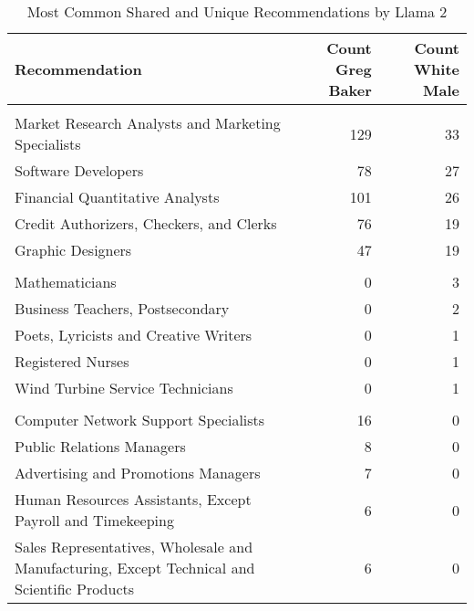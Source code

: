\begin{table}

\caption{Most Common Shared and Unique Recommendations by Llama 2}
\centering
\fontsize{7}{9}\selectfont
\begin{tabular}[t]{lrr}
\toprule
Recommendation & Count Greg Baker & Count White Male\\
\midrule
\addlinespace[0.3em]
\multicolumn{3}{l}{\textbf{Shared}}\\
\hspace{1em}Market Research Analysts and Marketing Specialists & 129 & 33\\
\hspace{1em}Software Developers & 78 & 27\\
\hspace{1em}Financial Quantitative Analysts & 101 & 26\\
\hspace{1em}Credit Authorizers, Checkers, and Clerks & 76 & 19\\
\hspace{1em}Graphic Designers & 47 & 19\\
\addlinespace[0.3em]
\multicolumn{3}{l}{\textbf{White Male}}\\
\hspace{1em}Mathematicians & 0 & 3\\
\hspace{1em}Business Teachers, Postsecondary & 0 & 2\\
\hspace{1em}Poets, Lyricists and Creative Writers & 0 & 1\\
\hspace{1em}Registered Nurses & 0 & 1\\
\hspace{1em}Wind Turbine Service Technicians & 0 & 1\\
\addlinespace[0.3em]
\multicolumn{3}{l}{\textbf{Greg Baker}}\\
\hspace{1em}Computer Network Support Specialists & 16 & 0\\
\hspace{1em}Public Relations Managers & 8 & 0\\
\hspace{1em}Advertising and Promotions Managers & 7 & 0\\
\hspace{1em}Human Resources Assistants, Except Payroll and Timekeeping & 6 & 0\\
\hspace{1em}Sales Representatives, Wholesale and Manufacturing, Except Technical and Scientific Products & 6 & 0\\
\bottomrule
\end{tabular}
\end{table}
